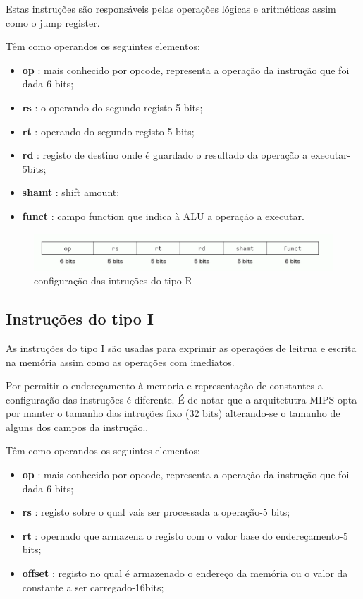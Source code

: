 \documentclass[10pt,a4paper]{book}
\begin{document}
	Estas instruções são responsáveis pelas operações lógicas e aritméticas assim como o jump register.

	Têm como operandos os seguintes elementos:
	 \begin{itemize}
	 	\item \textbf{op} : mais conhecido por opcode, representa a operação da instrução que foi dada-6 bits;
	 	\item \textbf{rs} : o operando do segundo registo-5 bits;
	 	\item \textbf{rt} : operando do segundo registo-5 bits;
	 	\item \textbf{rd} : registo de destino onde é guardado o resultado da operação a executar-5bits;
		\item \textbf{shamt} : shift amount;
		\item \textbf{funct} : campo function que indica à ALU a operação a executar.
	 \end{itemize}


	\begin{figure}[htp]
	    \centering
	    \includegraphics[scale=0.4]{fig1.png}
	    \caption{configuração das intruções do tipo R}
	    \label{insturçãor}
	\end{figure}



	\subsection{Instruções do tipo I}

	As instruções do tipo I são usadas para exprimir as operações de leitrua e escrita na memória assim como as operações com imediatos.

	Por permitir o endereçamento à memoria e representação de constantes a configuração das instruções é diferente.
	É de notar que a arquitetutra MIPS opta por manter o tamanho das intruções fixo (32 bits) alterando-se o tamanho de alguns dos campos da instrução..

	Têm como operandos os seguintes elementos:
	 \begin{itemize}
	 	\item \textbf{op} : mais conhecido por opcode, representa a operação da instrução que foi dada-6 bits;
	 	\item \textbf{rs} : registo sobre o qual vais ser processada a operação-5 bits;
	 	\item \textbf{rt} : opernado que armazena o registo com o valor base do endereçamento-5 bits;
	 	\item \textbf{offset} : registo no qual é armazenado o endereço da memória ou o valor da constante a ser carregado-16bits;
	 \end{itemize}
\end{document}
